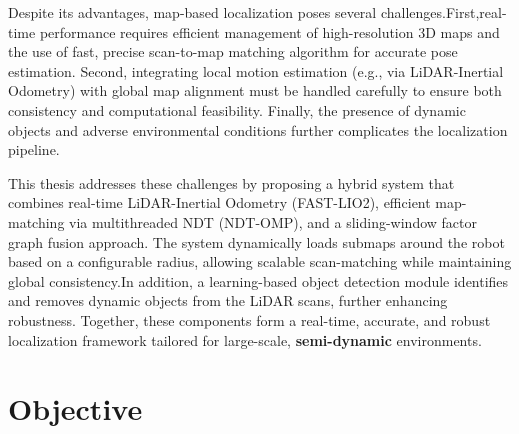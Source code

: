 Despite its advantages, map-based localization poses several challenges.First,real-time performance requires efficient management of high-resolution 3D maps and the use of fast, precise scan-to-map matching algorithm for accurate pose estimation. Second, integrating local motion estimation (e.g., via LiDAR-Inertial Odometry) with global map alignment must be handled carefully to ensure both consistency and computational feasibility. Finally, the presence of dynamic objects and adverse environmental conditions further complicates the localization pipeline.

This thesis addresses these challenges by proposing a hybrid system that combines real-time LiDAR-Inertial Odometry (FAST-LIO2), efficient map-matching via multithreaded NDT (NDT-OMP), and a sliding-window factor graph fusion approach. The system dynamically loads submaps around the robot based on a configurable radius, allowing scalable scan-matching while maintaining global consistency.In addition, a learning-based object detection module identifies and removes dynamic objects from the LiDAR scans, further enhancing robustness. Together, these components form a real-time, accurate, and robust localization framework tailored for large-scale, \textbf{semi-dynamic} environments.

\section{Objective}

